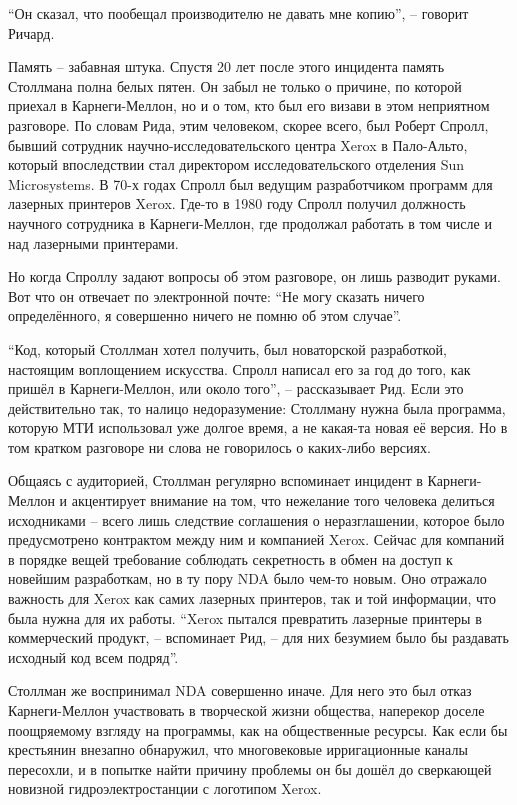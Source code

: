 \enquote{Он сказал, что пообещал производителю не давать мне копию}, -- говорит Ричард.

Память -- забавная штука. Спустя 20 лет после этого инцидента память Столлмана полна белых пятен. Он забыл не только о причине, по которой приехал в Карнеги-Меллон, но и о том, кто был его визави в этом неприятном разговоре. По словам Рида, этим человеком, скорее всего, был Роберт Спролл, бывший сотрудник научно-исследовательского центра Xerox в Пало-Альто, который впоследствии стал директором исследовательского отделения Sun Microsystems. В 70-х годах Спролл был ведущим разработчиком программ для лазерных принтеров Xerox. Где-то в 1980 году Спролл получил должность научного сотрудника в Карнеги-Меллон, где продолжал работать в том числе и над лазерными принтерами.

Но когда Спроллу задают вопросы об этом разговоре, он лишь разводит руками. Вот что он отвечает по электронной почте: \enquote{Не могу сказать ничего определённого, я совершенно ничего не помню об этом случае}.

\enquote{Код, который Столлман хотел получить, был новаторской разработкой, настоящим воплощением искусства. Спролл написал его за год до того, как пришёл в Карнеги-Меллон, или около того}, -- рассказывает Рид. Если это действительно так, то налицо недоразумение: Столлману нужна была программа, которую МТИ использовал уже долгое время, а не какая-та новая её версия. Но в том кратком разговоре ни слова не говорилось о каких-либо версиях.

Общаясь с аудиторией, Столлман регулярно вспоминает инцидент в Карнеги-Меллон и акцентирует внимание на том, что нежелание того человека делиться исходниками -- всего лишь следствие соглашения о неразглашении, которое было предусмотрено контрактом между ним и компанией Xerox. Сейчас для компаний в порядке вещей требование соблюдать секретность в обмен на доступ к новейшим разработкам, но в ту пору NDA было чем-то новым. Оно отражало важность для Xerox как самих лазерных принтеров, так и той информации, что была нужна для их работы. \enquote{Xerox пытался превратить лазерные принтеры в коммерческий продукт, -- вспоминает Рид, -- для них безумием было бы раздавать исходный код всем подряд}.

Столлман же воспринимал NDA совершенно иначе. Для него это был отказ Карнеги-Меллон участвовать в творческой жизни общества, наперекор доселе поощряемому взгляду на программы, как на общественные ресурсы. Как если бы крестьянин внезапно обнаружил, что многовековые ирригационные каналы пересохли, и в попытке найти причину проблемы он бы дошёл до сверкающей новизной гидроэлектростанции с логотипом Xerox.

